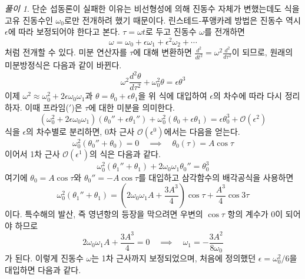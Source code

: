 \documentclass[chapter, oneside, b5paper]{oblivoir}
\theoremstyle{plain}
\theoremstyle{definition}
\theoremstyle{remark}
\newtheorem*{solution}{풀이}
\begin{document}
\begin{solution}
    단순 섭동론이 실패한 이유는 비선형성에 의해 진동수 자체가 변했는데도 식을 고유 진동수인 $\omega_0$로만 전개하려 했기 때문이다. 린스테드-푸앵카레 방법은 진동수 역시 $\epsilon$에 따라 보정되어야 한다고 본다. $\tau=\omega t$로 두고 진동수 $\omega$를 전개하면
        \begin{equation}
        \omega = \omega_0 + \epsilon \omega_1 + \epsilon^2 \omega_2 + \cdots
    \end{equation}
    처럼 전개할 수 있다. 미분 연산자를 $\tau$에 대해 변환하면 $\frac{d^2}{dt^2} = \omega^2 \frac{d^2}{d\tau^2}$이 되므로, 원래의 미분방정식은 다음과 같이 바뀐다.
    \begin{equation}
        \omega^2 \frac{d^2\theta}{d\tau^2} + \omega_0^2 \theta = \epsilon \theta^3
    \end{equation}
    이제 $\omega^2 \approx \omega_0^2 + 2\epsilon\omega_0\omega_1$과 $\theta = \theta_0 + \epsilon\theta_1$을 위 식에 대입하여 $\epsilon$의 차수에 따라 다시 정리하자. 이때 프라임($'$)은 $\tau$에 대한 미분을 의미한다.
    \begin{equation}
        (\omega_0^2 + 2\epsilon\omega_0\omega_1)(\theta_0'' + \epsilon\theta_1'') + \omega_0^2(\theta_0 + \epsilon\theta_1) = \epsilon\theta_0^3 + \mathcal{O}(\epsilon^2)
    \end{equation}
    식을 $\epsilon$의 차수별로 분리하면, 0차 근사 $\mathcal{O}(\epsilon^0)$에서는 다음을 얻는다.
    \begin{equation}
        \omega_0^2 (\theta_0'' + \theta_0) = 0 \quad \implies \quad \theta_0(\tau) = A\cos\tau
    \end{equation}
    이어서 1차 근사 $\mathcal{O}(\epsilon^1)$의 식은 다음과 같다.
    \begin{equation}
        \omega_0^2 (\theta_1'' + \theta_1) + 2\omega_0\omega_1\theta_0'' = \theta_0^3
    \end{equation}
    여기에 $\theta_0=A\cos\tau$와 $\theta_0''=-A\cos\tau$를 대입하고 삼각함수의 배각공식을 사용하면
    \begin{equation}
        \omega_0^2 (\theta_1'' + \theta_1) = \left( 2\omega_0\omega_1 A + \frac{3A^3}{4} \right)\cos\tau + \frac{A^3}{4}\cos3\tau
    \end{equation}
    이다. 특수해의 발산, 즉 영년항의 등장을 막으려면 우변의 $\cos\tau$ 항의 계수가 0이 되어야 하므로
    \begin{equation}
        2\omega_0\omega_1 A + \frac{3A^3}{4} = 0 \quad \implies \quad \omega_1 = -\frac{3A^2}{8\omega_0}
    \end{equation}
    가 된다. 이렇게 진동수 $\omega$는 1차 근사까지 보정되었으며, 처음에 정의했던 $\epsilon = \omega_0^2/6$을 대입하면 다음과 같다.

\end{solution}
\end{document}
